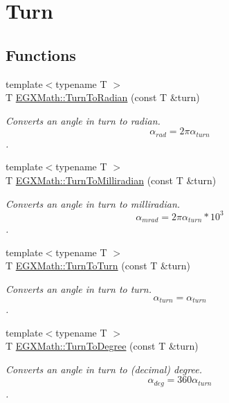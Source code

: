 \hypertarget{group___e_g_x_math-_angle_conversions-_turn}{}\section{Turn}
\label{group___e_g_x_math-_angle_conversions-_turn}
\subsection*{Functions}
\begin{DoxyCompactItemize}
\item 
{\footnotesize template$<$typename T $>$ }\\T \mbox{\hyperlink{group___e_g_x_math-_angle_conversions-_turn_ga72e6d3c46ebfc25f7be5050136d8df16}{E\+G\+X\+Math\+::\+Turn\+To\+Radian}} (const T \&turn)
\begin{DoxyCompactList}\small\item\em Converts an angle in turn to radian. \[\alpha_{rad}=2\pi\alpha_{turn}\]. \end{DoxyCompactList}\item 
{\footnotesize template$<$typename T $>$ }\\T \mbox{\hyperlink{group___e_g_x_math-_angle_conversions-_turn_ga2aea2621472294ce4c25ac7e55db51c6}{E\+G\+X\+Math\+::\+Turn\+To\+Milliradian}} (const T \&turn)
\begin{DoxyCompactList}\small\item\em Converts an angle in turn to milliradian. \[\alpha_{mrad}=2\pi\alpha_{turn}*10^3\]. \end{DoxyCompactList}\item 
{\footnotesize template$<$typename T $>$ }\\T \mbox{\hyperlink{group___e_g_x_math-_angle_conversions-_turn_ga32c8dfa2861fefd0b18e36f8d6d95ed4}{E\+G\+X\+Math\+::\+Turn\+To\+Turn}} (const T \&turn)
\begin{DoxyCompactList}\small\item\em Converts an angle in turn to turn. \[\alpha_{turn}=\alpha_{turn}\]. \end{DoxyCompactList}\item 
{\footnotesize template$<$typename T $>$ }\\T \mbox{\hyperlink{group___e_g_x_math-_angle_conversions-_turn_ga19eceb6db54a1cf17789639c2a869cb9}{E\+G\+X\+Math\+::\+Turn\+To\+Degree}} (const T \&turn)
\begin{DoxyCompactList}\small\item\em Converts an angle in turn to (decimal) degree. \[\alpha_{deg}=360\alpha_{turn}\]. \end{DoxyCompactList}\item 

\end{DoxyCompactItemize}
